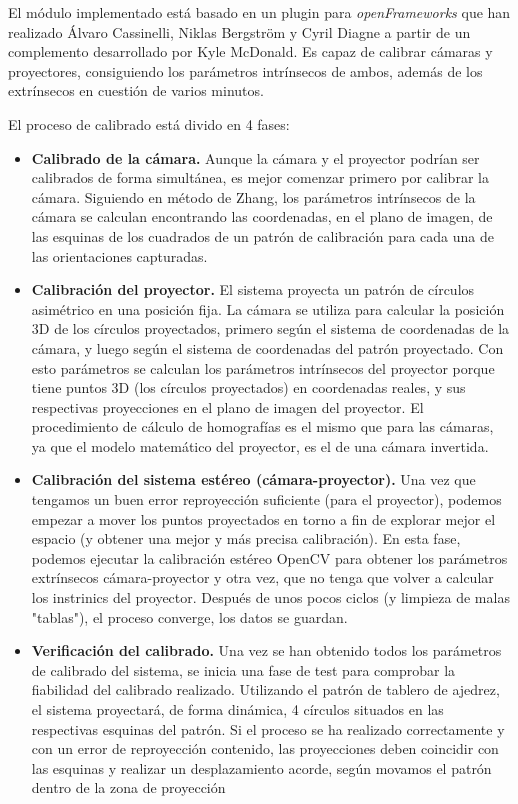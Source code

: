 El módulo implementado está basado en un plugin para \textit{openFrameworks} que han realizado Álvaro Cassinelli, Niklas Bergström y Cyril Diagne a partir de un complemento desarrollado por Kyle McDonald. Es capaz de calibrar cámaras y proyectores, consiguiendo los parámetros intrínsecos de ambos, además de los extrínsecos en cuestión de varios minutos. 

El proceso de calibrado está divido en 4 fases:

\begin{itemize}
\item\textbf{Calibrado de la cámara. } Aunque la cámara y el proyector podrían ser calibrados de forma simultánea, es mejor comenzar primero por calibrar la cámara. Siguiendo en método de Zhang, los parámetros intrínsecos de la cámara se calculan encontrando las coordenadas, en el plano de imagen, de las esquinas de los cuadrados de un patrón de calibración para cada una de las orientaciones capturadas.

\item\textbf{Calibración del proyector. } El sistema proyecta un patrón de círculos asimétrico en una posición fija. La cámara se utiliza para calcular la posición 3D de los círculos proyectados, primero según el sistema de coordenadas de la cámara, y luego según el sistema de coordenadas del patrón proyectado. Con esto parámetros se calculan los parámetros intrínsecos del proyector porque tiene puntos 3D (los círculos proyectados) en coordenadas reales, y sus respectivas proyecciones en el plano de imagen del proyector. El procedimiento de cálculo de homografías es el mismo que para las cámaras, ya que el modelo matemático del proyector, es el de una cámara invertida. 

\item\textbf{Calibración del sistema estéreo (cámara-proyector). } Una vez que tengamos un buen error reproyección suficiente (para el proyector), podemos empezar a mover los puntos proyectados en torno a fin de explorar mejor el espacio (y obtener una mejor y más precisa calibración). En esta fase, podemos ejecutar la calibración estéreo OpenCV para obtener los parámetros extrínsecos cámara-proyector y otra vez, que no tenga que volver a calcular los instrinics del proyector. Después de unos pocos ciclos (y limpieza de malas "tablas"), el proceso converge, los datos se guardan.

\item\textbf{Verificación del calibrado. } Una vez se han obtenido todos los parámetros de calibrado del sistema, se inicia una fase de test para comprobar la fiabilidad del calibrado realizado. Utilizando el patrón de tablero de ajedrez, el sistema proyectará, de forma dinámica, 4 círculos situados en las respectivas esquinas del patrón. Si el proceso se ha realizado correctamente y con un error de reproyección contenido, las proyecciones deben coincidir con las esquinas y realizar un desplazamiento acorde, según movamos el patrón dentro de la zona de proyección 
\end{itemize}

